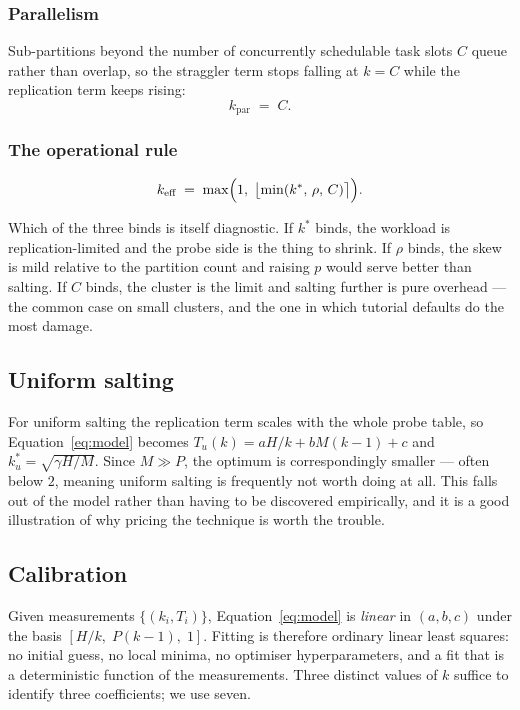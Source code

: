 \subsubsection{Parallelism}
Sub-partitions beyond the number of concurrently schedulable task slots $C$
queue rather than overlap, so the straggler term stops falling at $k=C$ while
the replication term keeps rising:
\begin{equation}
k_{\text{par}} \;=\; C .
\end{equation}

\subsubsection{The operational rule}
\begin{equation}
k_{\text{eff}} \;=\; \max\Bigl(1,\;\bigl\lfloor \min(k^{*},\,\rho,\,C) \bigr\rceil\Bigr) .
\label{eq:keff}
\end{equation}

Which of the three binds is itself diagnostic. If $k^{*}$ binds, the workload
is replication-limited and the probe side is the thing to shrink. If $\rho$
binds, the skew is mild relative to the partition count and raising $p$ would
serve better than salting. If $C$ binds, the cluster is the limit and salting
further is pure overhead --- the common case on small clusters, and the one in
which tutorial defaults do the most damage.

\subsection{Uniform salting}

For uniform salting the replication term scales with the whole probe table, so
Equation~\eqref{eq:model} becomes $T_{u}(k) = aH/k + bM(k-1) + c$ and
$k_{u}^{*} = \sqrt{\gamma H/M}$. Since $M \gg P$, the optimum is
correspondingly smaller --- often below $2$, meaning uniform salting is
frequently not worth doing at all. This falls out of the model rather than
having to be discovered empirically, and it is a good illustration of why
pricing the technique is worth the trouble.

\subsection{Calibration}

Given measurements $\{(k_i, T_i)\}$, Equation~\eqref{eq:model} is \emph{linear}
in $(a,b,c)$ under the basis $[H/k,\; P(k-1),\; 1]$. Fitting is therefore
ordinary linear least squares: no initial guess, no local minima, no optimiser
hyperparameters, and a fit that is a deterministic function of the
measurements. Three distinct values of $k$ suffice to identify three
coefficients; we use seven.

